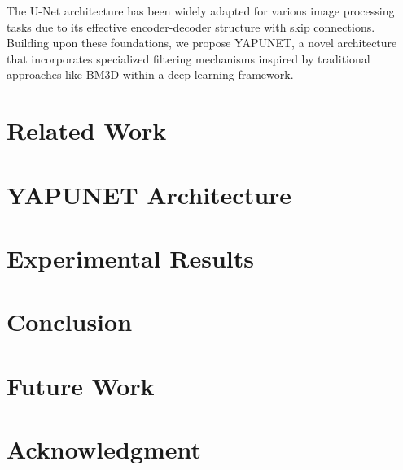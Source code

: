 \documentclass[conference]{IEEEtran}
\begin{document}
The U-Net architecture \cite{ronneberger2015u} has been widely adapted for various image processing tasks due to its effective encoder-decoder structure with skip connections. Building upon these foundations, we propose YAPUNET, a novel architecture that incorporates specialized filtering mechanisms inspired by traditional approaches like BM3D \cite{dabov2007image} within a deep learning framework.

\section{Related Work}
\label{sec:related}

\section{YAPUNET Architecture}
\label{sec:architecture}

\section{Experimental Results}
\label{sec:results}

\section{Conclusion}
\label{sec:conclusion}

\section{Future Work}
\label{sec:future}

\section*{Acknowledgment}


\end{document}
